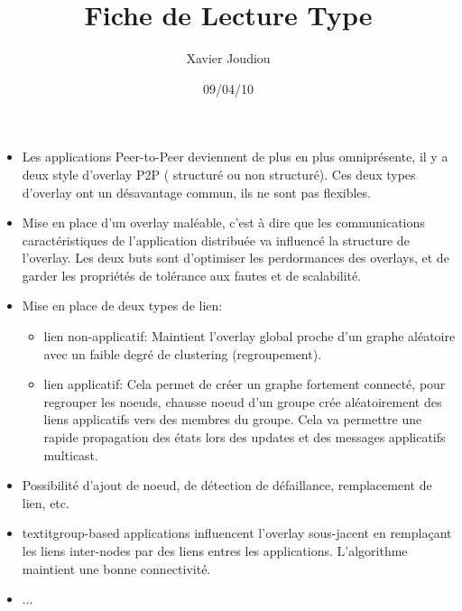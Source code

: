 \documentclass[11pt,a4paper]{article}
\title{Fiche de Lecture Type}
\author{Xavier Joudiou}
\date{09/04/10}
\begin{document}
	
  \begin{itemize}
  \renewcommand{\labelitemi}{$\Rightarrow$}
	\item Les applications Peer-to-Peer deviennent de plus en plus omniprésente, il y a deux style d'overlay P2P ( structuré ou non structuré). Ces deux types d'overlay ont un désavantage commun, ils ne sont pas flexibles.
	\item Mise en place d'un overlay maléable, c'est à dire que les communications caractéristiques de l'application distribuée va influencé la structure de l'overlay. Les deux buts sont d'optimiser les perdormances des overlays, et de garder les propriétés de tolérance aux fautes et de scalabilité.
	\item Mise en place de deux types de lien:
	\begin{itemize}
  	\renewcommand{\labelitemi}{$\surd$}
		\item lien non-applicatif: Maintient l'overlay global proche d'un graphe aléatoire avec un faible degré de clustering (regroupement).
		\item lien applicatif: Cela permet de créer un graphe fortement connecté, pour regrouper les noeuds, chausse noeud d'un groupe crée aléatoirement des liens applicatifs vers des membres du groupe. Cela va permettre une rapide propagation des états lors des updates et des messages applicatifs multicast. 
	\end{itemize} 
	\item Possibilité d'ajout de noeud, de détection de défaillance, remplacement de lien, etc.
	\item textit{group}-based applications influencent l'overlay sous-jacent en remplaçant les liens inter-nodes par des liens entres les applications. L'algorithme maintient une bonne connectivité.
	\item ...
  \end{itemize}
\end{document}
